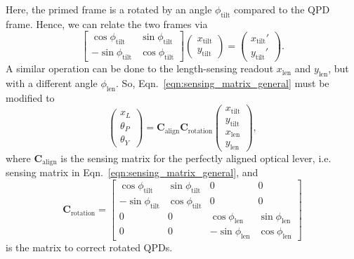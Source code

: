 Here, the primed frame is a rotated by an angle $\phi_\mathrm{tilt}$ compared to the QPD frame.
Hence, we can relate the two frames via 
\begin{equation}
	\begin{bmatrix}
		\cos\phi_\mathrm{tilt} & \sin\phi_\mathrm{tilt}\\
		-\sin\phi_\mathrm{tilt} & \cos\phi_\mathrm{tilt}
	\end{bmatrix}
	\begin{pmatrix}
		x_\mathrm{tilt}\\
		y_\mathrm{tilt}
	\end{pmatrix}
	=
	\begin{pmatrix}
		x_\mathrm{tilt}'\\
		y_\mathrm{tilt}'
	\end{pmatrix}.
\end{equation}
A similar operation can be done to the length-sensing readout $x_\mathrm{len}$ and $y_\mathrm{len}$, but with a different angle $\phi_\mathrm{len}$.
So, Eqn.~\eqref{eqn:sensing_matrix_general} must be modified to
\begin{equation}
	\begin{pmatrix}
		x_L\\
		\theta_P\\
		\theta_Y
	\end{pmatrix}
	=
	\mathbf{C}_\mathrm{align}
	\mathbf{C}_\mathrm{rotation}
	\begin{pmatrix}
		x_\mathrm{tilt}\\
		y_\mathrm{tilt}\\
		x_\mathrm{len}\\
		y_\mathrm{len}
	\end{pmatrix},
	\label{eqn:sensing_matrix_general_rotation}
\end{equation}
where $\mathbf{C}_\mathrm{align}$ is the sensing matrix for the perfectly aligned optical lever, i.e. sensing matrix in Eqn.~\eqref{eqn:sensing_matrix_general},
and
\begin{equation}
	\mathbf{C}_\mathrm{rotation}
	=
	\begin{bmatrix}
		\cos\phi_\mathrm{tilt} & \sin\phi_\mathrm{tilt} & 0 & 0\\
		-\sin\phi_\mathrm{tilt} & \cos\phi_\mathrm{tilt} & 0 & 0\\
		0 & 0 & \cos\phi_\mathrm{len} & \sin\phi_\mathrm{len} \\
		0 & 0 & -\sin\phi_\mathrm{len} & \cos\phi_\mathrm{len}
	\end{bmatrix}
\end{equation}
is the matrix to correct rotated QPDs.


